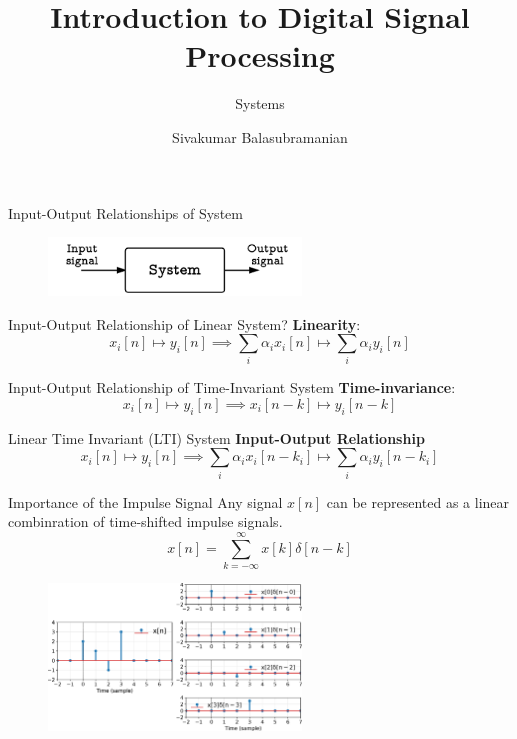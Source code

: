 \documentclass[aspectratio=169]{beamer}
\title{Introduction to Digital Signal Processing}
\subtitle{Systems}
\author{Sivakumar Balasubramanian}
\institute[Christian Medical College] %
{
  \inst{}%
  Department of Bioengineering\\
  Christian Medical College, Bagayam\\
  Vellore 632002
}
\date{}
\begin{document}
\begin{frame}
  \titlepage
\end{frame}

\begin{frame}[t]{Input-Output Relationships of System}
\begin{figure}
\includegraphics[width=0.6\textwidth]{img/system.png}
\end{figure}
\end{frame}

\begin{frame}[t]{Input-Output Relationship of Linear System?}
\textbf{Linearity}:
\[ x_i[n] \mapsto y_i[n] \implies \sum_{i} \alpha_i x_i[n] \mapsto \sum_{i} \alpha_i y_i[n] \]
\end{frame}

\begin{frame}[t]{Input-Output Relationship of Time-Invariant System}
\textbf{Time-invariance}:  
\[ x_i[n] \mapsto y_i[n] \implies x_i[n - k] \mapsto y_i[n-k] \]
\end{frame}

\begin{frame}[t]{Linear Time Invariant (LTI) System}
\textbf{Input-Output Relationship}
\[ x_i[n] \mapsto y_i[n] \implies \sum_{i} \alpha_i x_i[n - k_i] \mapsto \sum_{i} \alpha_i y_i[n - k_i] \]
\end{frame}

\begin{frame}[t]{Importance of the Impulse Signal}
Any signal $x[n]$ can be represented as a linear combinration of time-shifted impulse signals.
\[ x[n]  = \sum_{k=-\infty}^{\infty} x[k] \delta[n - k] \]
\begin{figure}
\includegraphics[width=0.6\textwidth]{img/sigimpdecomp.eps}
\end{figure}
\end{frame}
\end{document}
